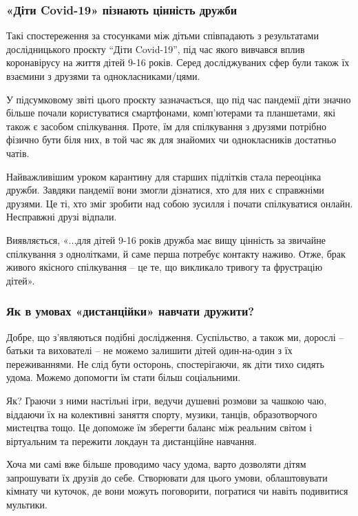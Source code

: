 \subsubsection{«Діти Covid-19» пізнають цінність дружби}

Такі спостереження за стосунками між дітьми співпадають з результатами
дослідницького проєкту “Діти Covid-19”, під час якого вивчався вплив
коронавірусу на життя дітей 9-16 років. Серед досліджуваних сфер були також їх
взаємини з друзями та однокласниками/цями.

У підсумковому звіті цього проєкту зазначається, що під час пандемії діти
значно більше почали користуватися смартфонами, комп’ютерами та планшетами, які
також є засобом спілкування. Проте, їм для спілкування з друзями потрібно
фізично бути біля них, в той час як для знайомих чи однокласників достатньо
чатів.

Найважливішим уроком карантину для старших підлітків стала переоцінка дружби.
Завдяки пандемії вони змогли дізнатися, хто для них є справжніми друзями. Це
ті, хто зміг зробити над собою зусилля і почати спілкуватися онлайн. Несправжні
друзі відпали.

\begin{zznagolos}
Виявляється, «...для дітей 9-16 років дружба має вищу цінність за звичайне
спілкування з однолітками, й саме перша потребує контакту наживо. Отже, брак
живого якісного спілкування – це те, що викликало тривогу та фрустрацію дітей».	
\end{zznagolos}

\subsubsection{Як в умовах «дистанційки» навчати дружити?}

Добре, що з'являються подібні дослідження. Суспільство, а також ми, дорослі –
батьки та вихователі – не можемо залишити дітей один-на-один з їх
переживаннями. Не слід бути осторонь, спостерігаючи, як діти тихо сидять удома.
Можемо допомогти їм стати більш соціальними.

Як? Граючи з ними настільні ігри, ведучи душевні розмови за чашкою чаю,
віддаючи їх на колективні заняття спорту, музики, танців, образотворчого
мистецтва тощо. Це допоможе їм зберегти баланс між реальним світом і
віртуальним та пережити локдаун та дистанційне навчання.

Хоча ми самі вже більше проводимо часу удома, варто дозволяти дітям запрошувати
їх друзів до себе. Створювати для цього умови, облаштовувати кімнату чи
куточок, де вони можуть поговорити, погратися чи навіть подивитися мультики.

